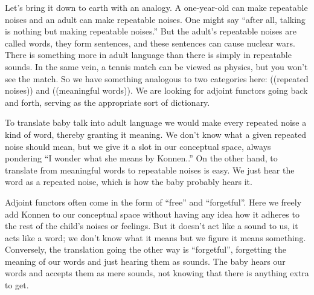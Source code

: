 \documentclass[../main/CT4S-EN-RU]{subfiles}
\begin{document}
\begin{blockRUS}
\end{blockRUS}

\begin{blockENG}
Let's bring it down to earth with an analogy. A one-year-old can make repeatable noises and an adult can make repeatable noises. One might say “after all, talking is nothing but making repeatable noises.” But the adult's repeatable noises are called words, they form sentences, and these sentences can cause nuclear wars. There is something more in adult language than there is simply in repeatable sounds. In the same vein, a tennis match can be viewed as physics, but you won't see the match. So we have something analogous to two categories here: ((repeated noises)) and ((meaningful words)). We are looking for adjoint functors going back and forth, serving as the appropriate sort of dictionary.
\end{blockENG}

\begin{blockRUS}
\end{blockRUS}

\begin{blockENG}
To translate baby talk into adult language we would make every repeated noise a kind of word, thereby granting it meaning. We don't know what a given repeated noise should mean, but we give it a slot in our conceptual space, always pondering “I wonder what she means by Konnen..” On the other hand, to translate from meaningful words to repeatable noises is easy. We just hear the word as a repeated noise, which is how the baby probably hears it.
\end{blockENG}

\begin{blockRUS}
\end{blockRUS}

\begin{blockENG}
Adjoint functors often come in the form of “free” and “forgetful”. Here we freely add Konnen to our conceptual space without having any idea how it adheres to the rest of the child's noises or feelings. But it doesn't act like a sound to us, it acts like a word; we don't know what it means but we figure it means something. Conversely, the translation going the other way is “forgetful”, forgetting the meaning of our words and just hearing them as sounds. The baby hears our words and accepts them as mere sounds, not knowing that there is anything extra to get.
\end{blockENG}
\end{document}
